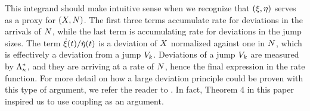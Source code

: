 \begin{example}
\begin{equation}
  \end{equation}
  This integrand should make intuitive sense when we recognize that $(\xi, \eta)$ serves as a proxy for $(X, N)$.
  The first three terms accumulate rate for deviations in the arrivals of $N$, while the last term is accumulating rate for deviations in the jump sizes.
  The term $\dot{\xi}(t)/\dot\eta(t)$ is a deviation of $X$ normalized against one in $N$, which is effectively a deviation from a jump $V_k$.
  Deviations of a jump $V_k$ are measured by $\Lambda_\kappa^*$, and they are arriving at a rate of $N$, hence the final expression in the rate function.
  For more detail on how a large deviation principle could be proven with this type of argument, we refer the reader to \cite{duffy2004}.
  In fact, Theorem 4 in this paper inspired us to use coupling as an argument.


\end{example}
